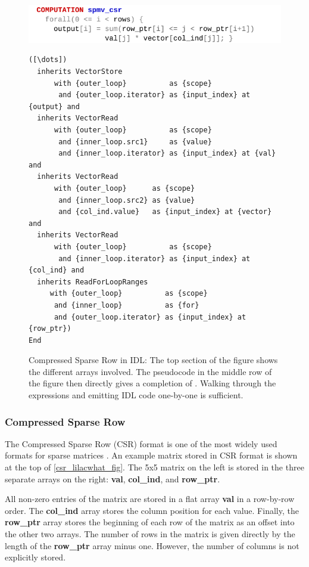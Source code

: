 \begin{figure}[p]
\includegraphics[width=\linewidth]{figures/spmvcsrwhat.pdf}
\vspace{-1.5em}
\begin{lstlisting}[language=IDL,firstnumber=7]
([\dots])
  inherits VectorStore
      with {outer_loop}          as {scope}
       and {outer_loop.iterator} as {input_index} at {output} and
  inherits VectorRead
      with {outer_loop}          as {scope}
       and {inner_loop.src1}     as {value}
       and {inner_loop.iterator} as {input_index} at {val} and
  inherits VectorRead
      with {outer_loop}      as {scope}
       and {inner_loop.src2} as {value}
       and {col_ind.value}   as {input_index} at {vector} and
  inherits VectorRead
      with {outer_loop}          as {scope}
       and {inner_loop.iterator} as {input_index} at {col_ind} and
  inherits ReadForLoopRanges
     with {outer_loop}          as {scope}
      and {inner_loop}          as {for}
      and {outer_loop.iterator} as {input_index} at {row_ptr})
End
\end{lstlisting}
\caption{Compressed Sparse Row in IDL:
         The top section of the figure shows the different arrays involved.
         The pseudocode in the middle row of the
         figure then directly gives a completion of .
         Walking through the expressions and emitting IDL code one-by-one is
         sufficient.}
\label{csr_lilacwhat_fig}
\end{figure}

\subsubsection{Compressed Sparse Row}

    The Compressed Sparse Row (CSR) format is one of the most widely used
    formats for sparse matrices \cite{doi:10.1137/1.9780898718003}.
    An example matrix stored in CSR format is shown at the top of
    \autoref{csr_lilacwhat_fig}.
    The 5x5 matrix on the left is stored in the three separate arrays on the
    right: \textbf{val}, \textbf{col\_ind}, and \textbf{row\_ptr}.

    All non-zero entries of the matrix are stored in a flat array \textbf{val}
    in a row-by-row order.
    The \textbf{col\_ind} array stores the column position for each value.
    Finally, the \textbf{row\_ptr} array stores the beginning of each row of the
    matrix as an offset into the other two arrays.
    The number of rows in the matrix is given directly by the length of the
    \textbf{row\_ptr} array minus one.
    However, the number of columns is not explicitly stored.

